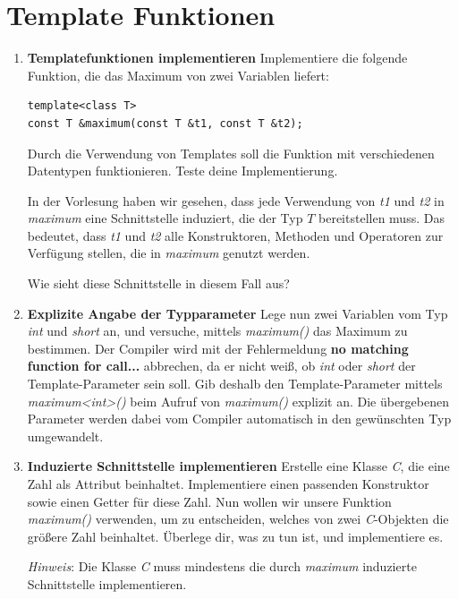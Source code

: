 \section{Template Funktionen}
\begin{enumerate}
\item \textbf{Templatefunktionen implementieren}
Implementiere die folgende Funktion, die das Maximum von zwei Variablen liefert:
\begin{lstlisting}
template<class T>
const T &maximum(const T &t1, const T &t2);
\end{lstlisting}

Durch die Verwendung von Templates soll die Funktion mit verschiedenen Datentypen funktionieren.
Teste deine Implementierung.

In der Vorlesung haben wir gesehen, dass jede Verwendung von \emph{t1} und \emph{t2} in \emph{maximum} eine Schnittstelle induziert, die der Typ $T$ bereitstellen muss.
Das bedeutet, dass \emph{t1} und \emph{t2} alle Konstruktoren, Methoden und Operatoren zur Verfügung stellen, die in \emph{maximum} genutzt werden.

Wie sieht diese Schnittstelle in diesem Fall aus?

\item \textbf{Explizite Angabe der Typparameter}
Lege nun zwei Variablen vom Typ \emph{int} und \emph{short} an, und versuche, mittels \emph{maximum()} das Maximum zu bestimmen.
Der Compiler wird mit der Fehlermeldung \textbf{no matching function for call...} abbrechen, da er nicht weiß, ob \emph{int} oder \emph{short} der Template-Parameter sein soll.
Gib deshalb den Template-Parameter mittels \emph{maximum<int>()} beim Aufruf von \emph{maximum()} explizit an.
Die übergebenen Parameter werden dabei vom Compiler automatisch in den gewünschten Typ umgewandelt.

\item \textbf{Induzierte Schnittstelle implementieren}
Erstelle eine Klasse \emph{C}, die eine Zahl als Attribut beinhaltet. Implementiere einen passenden Konstruktor sowie einen Getter für diese Zahl. Nun wollen wir unsere Funktion  \emph{maximum()} verwenden, um zu entscheiden, welches von zwei \emph{C}-Objekten die größere Zahl beinhaltet.
Überlege dir, was zu tun ist, und implementiere es. 

\emph{Hinweis}: Die Klasse \emph{C} muss mindestens die durch \emph{maximum} induzierte Schnittstelle implementieren.

\end{enumerate}

